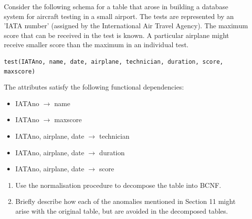 Consider the following schema for a table that arose in building a database system for aircraft testing in a small
airport. The tests are represented by an ’IATA number’ (assigned by the International Air Travel Agency). The
maximum score that can be received in the test is known. A particular airplane might receive smaller score than
the maximum in an individual test.

\texttt{test(IATAno, name, date, airplane, technician, duration, score, maxscore)}

The attributes satisfy the following functional dependencies:

\begin{itemize}
  \item IATAno $\rightarrow$ name
  \item IATAno $\rightarrow$ maxscore
  \item IATAno, airplane, date $\rightarrow$ technician
  \item IATAno, airplane, date $\rightarrow$ duration
  \item IATAno, airplane, date $\rightarrow$ score
\end{itemize}

\begin{enumerate}[label=\alph*.]
  \item Use the normalisation procedure to decompose the table into BCNF.
  \item Briefly describe how each of the anomalies mentioned in Section 11 might arise with the original table, but
  are avoided in the decomposed tables.
\end{enumerate}

